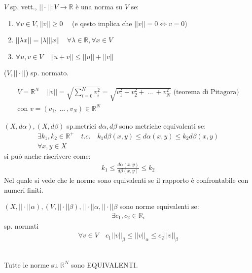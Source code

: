 \documentclass[a4paper, oneside]{article}
\begin{document}
\begin{definition}
    $V$ sp. vett., $||\cdot||:V \to \mathbb{R}$ è una norma su $V$ se:
    \begin{enumerate}[$i)$]
        \item $\forall v\in V, ||v|| \geq 0 \quad$ (e qesto implica che $||v||=0 \Leftrightarrow v=0$)
        \item $||\lambda x|| = |\lambda| ||x|| \quad \forall \lambda \in \mathbb{R}, \forall x \in V$
        \item $\forall u,v \in V \quad ||u+v|| \leq ||u||+||v||$
    \end{enumerate}
\end{definition}
\begin{definition}
    ($V,||\cdot||$) sp. normato.
\end{definition}
\begin{example}
    \begin{gather*}
        V=\mathbb{R}^N \quad ||v|| = \sqrt{\sum_{i=0}^{N}v_i^2} = \sqrt{v_1^2 + v_2^2 + \ ... \ + v_N^2} \text{ (teorema di Pitagora)}\\
        \text{con } v = (v_1, \ ... \ , v_N) \in \mathbb{R}^N
    \end{gather*}
\end{example}
\begin{definition}
    $(X, d\alpha),(X,d\beta)$ sp.metrici $d\alpha, d\beta$ sono metriche equivalenti se:\\
    \begin{gather*}
        \exists k_1,k_2 \in \mathbb{R}^+ \quad t.c. \quad k_1 d\beta(x,y) \leq d\alpha(x,y) \leq k_2 d\beta(x,y)\\
        \forall x,y \in X
    \end{gather*}
    si può anche riscrivere come:
    \begin{gather*}
        k_1 \leq \frac{d\alpha(x,y)}{d\beta(x,y)} \leq k_2
    \end{gather*}
    Nel quale si vede che le norme sono equivalenti se il rapporto è confrontabile con numeri finiti.
\end{definition}
\begin{definition}
    $(X, ||\cdot||\alpha), (V, ||\cdot|| \beta), ||\cdot|| \alpha, ||\cdot|| \beta$ sono norme equivalenti se:\\
    \begin{gather*}
        \exists c_1, c_2 \in \mathbb{R}_i
    \end{gather*}
    sp. normati
    \begin{gather*}
        \forall v \in V \quad c_1||v||_\beta \leq ||v||_\alpha \leq c_2 ||v||_\beta
    \end{gather*}
\end{definition}
\begin{theorem}
    \hfil\\
    Tutte le norme su $\mathbb{R}^N$ sono EQUIVALENTI.
\end{theorem}
\end{document}
